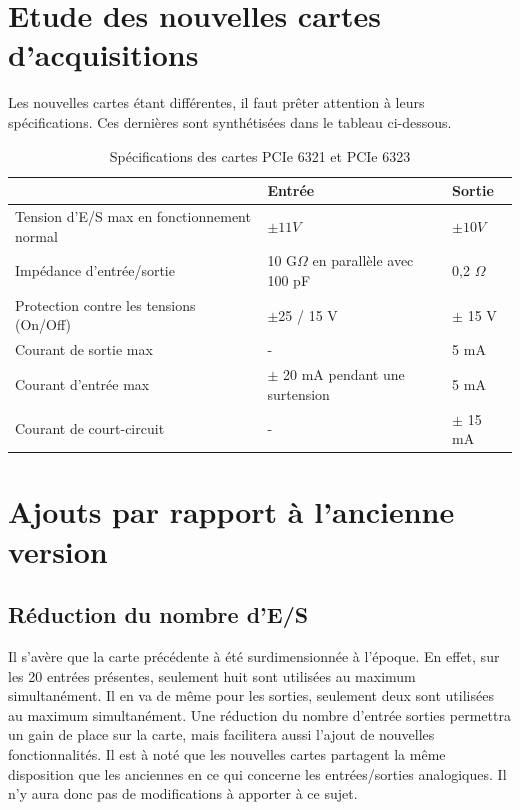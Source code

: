 \documentclass{report}
\begin{document}
\section{Etude des nouvelles cartes d'acquisitions}
Les nouvelles cartes étant différentes, il faut prêter attention à leurs spécifications. Ces dernières sont synthétisées dans le tableau ci-dessous.

\begin{table}[!h]
\begin{center}
\begin{tabular}{l|l|l|}
\cline{2-3}
                                                                 & Entrée                                & Sortie       \\ \hline
\multicolumn{1}{|l|}{Tension d'E/S max en fonctionnement normal} & $\pm 11 V$                            & $\pm 10 V$   \\ \hline
\multicolumn{1}{|l|}{Impédance d'entrée/sortie}                  & 10 G$\Omega$ en parallèle avec 100 pF & 0,2 $\Omega$ \\ \hline
\multicolumn{1}{|l|}{Protection contre les tensions (On/Off)}    & $\pm$25 / 15 V                        & $\pm$ 15 V   \\ \hline
\multicolumn{1}{|l|}{Courant de sortie max}                      & -                                     & 5 mA         \\ \hline
\multicolumn{1}{|l|}{Courant d'entrée max}                       & $\pm$ 20 mA pendant une surtension    & 5 mA         \\ \hline
\multicolumn{1}{|l|}{Courant de court-circuit}                   & -                                     & $\pm$ 15 mA  \\ \hline
\end{tabular}
\caption{Spécifications des cartes PCIe 6321 et PCIe 6323}
\end{center}
\end{table}

\section{Ajouts par rapport à l'ancienne version}
\subsection{Réduction du nombre d'E/S}
Il s'avère que la carte précédente à été surdimensionnée à l'époque. En effet, sur les 20 entrées présentes, seulement huit sont utilisées au maximum simultanément. Il en va de même pour les sorties, seulement deux sont utilisées au maximum simultanément. Une réduction du nombre d'entrée sorties permettra un gain de place sur la carte, mais facilitera aussi l'ajout de nouvelles fonctionnalités. Il est à noté que les nouvelles cartes partagent la même disposition que les anciennes en ce qui concerne les entrées/sorties analogiques. Il n'y aura donc pas de modifications à apporter à ce sujet.
\end{document}
